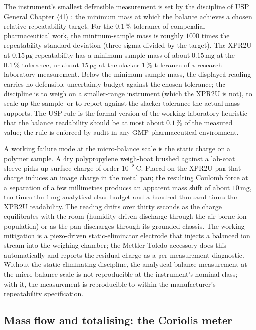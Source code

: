 The instrument's smallest defensible measurement is set by the
 discipline of USP General Chapter
$\langle$41$\rangle$ \cite{ch07t3b-std:usp-41-2024}: the minimum mass
at which the balance achieves a chosen relative repeatability target.
For the $0.1\,\%$ tolerance of compendial pharmaceutical work, the
minimum-sample mass is roughly $1000$ times the repeatability
standard deviation (three sigma divided by the target). The XPR2U
at $0.15 \,\si{\micro\gram}$ repeatability has a minimum-sample mass
of about $0.15 \,\si{\milli\gram}$ at the $0.1\,\%$ tolerance, or
about $15 \,\si{\micro\gram}$ at the slacker $1\,\%$ tolerance of a
research-laboratory measurement. Below the minimum-sample mass, the
displayed reading carries no defensible uncertainty budget against
the chosen tolerance; the discipline is to weigh on a smaller-range
instrument (which the XPR2U is not), to scale up the sample, or to
report against the slacker tolerance the actual mass supports. The
USP rule is the formal version of the working laboratory heuristic
that the balance readability should be at most about $0.1\,\%$ of
the measured value; the rule is enforced by audit in any GMP
pharmaceutical environment.

A working failure mode at the micro-balance scale is the static
charge on a polymer sample. A dry polypropylene weigh-boat brushed
against a lab-coat sleeve picks up surface charge of order
$10^{-8} \,\si{\coulomb}$. Placed on the XPR2U pan that charge
induces an image charge in the metal pan; the resulting Coulomb
force at a separation of a few millimetres produces an apparent
mass shift of about $10 \,\si{\milli\gram}$, ten times the
$1 \,\si{\milli\gram}$ analytical-class budget and a hundred
thousand times the XPR2U readability. The reading drifts over thirty
seconds as the charge equilibrates with the room (humidity-driven
discharge through the air-borne ion population) or as the pan
discharges through its grounded chassis. The working mitigation is
a piezo-driven static-eliminator electrode that injects a balanced
ion stream into the weighing chamber; the Mettler Toledo
 accessory does this automatically and reports
the residual charge as a per-measurement diagnostic. Without the
static-eliminating discipline, the analytical-balance measurement
at the micro-balance scale is not reproducible at the instrument's
nominal class; with it, the measurement is reproducible to within
the manufacturer's repeatability specification.

\subsection{Mass flow and totalising: the Coriolis meter}

